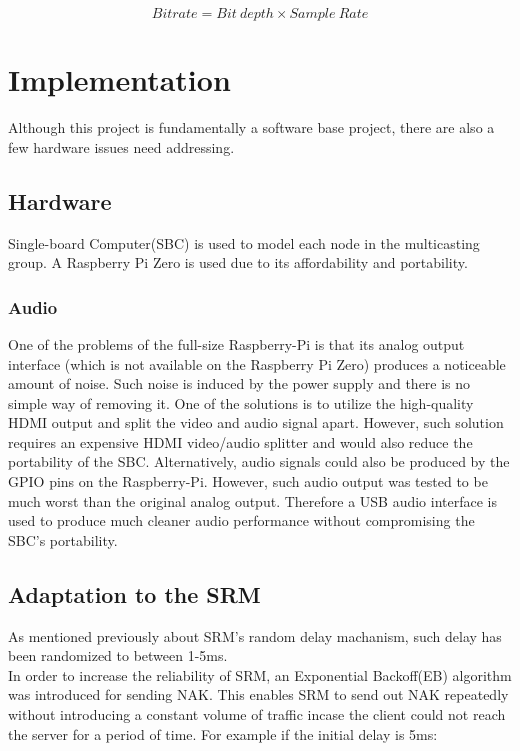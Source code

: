 \documentclass[12pt]{article}
\begin{document}
\[ Bitrate = Bit\ depth \times Sample\ Rate\]


\section{Implementation}

Although this project is fundamentally a software base project, there are also a few hardware issues need addressing. 

\subsection{Hardware}
Single-board Computer(SBC) is used to model each node in the multicasting group. A Raspberry Pi Zero is used due to its affordability and portability. 

\subsubsection{Audio}
One of the problems of the full-size Raspberry-Pi is that its analog output interface (which is not available on the Raspberry Pi Zero) produces a noticeable amount of noise. Such noise is induced by the power supply and there is no simple way of removing it. One of the solutions is to utilize the high-quality HDMI output and split the video and audio signal apart. However, such solution requires an expensive HDMI video/audio splitter and would also reduce the portability of the SBC. Alternatively, audio signals could also be produced by the GPIO pins on the Raspberry-Pi. However, such audio output was tested to be much worst than the original analog output. Therefore a USB audio interface is used to produce much cleaner audio performance without compromising the SBC's portability.

\subsection{Adaptation to the SRM}
As mentioned previously about SRM's random delay machanism, such delay has been randomized to between 1-5ms. \\

In order to increase the reliability of SRM, an Exponential Backoff(EB) algorithm\cite{Exponential_Backoff:1} was introduced for sending NAK. This enables SRM to send out NAK repeatedly without introducing a constant volume of traffic incase the client could not reach the server for a period of time. For example if the initial delay is 5ms:
\end{document}
